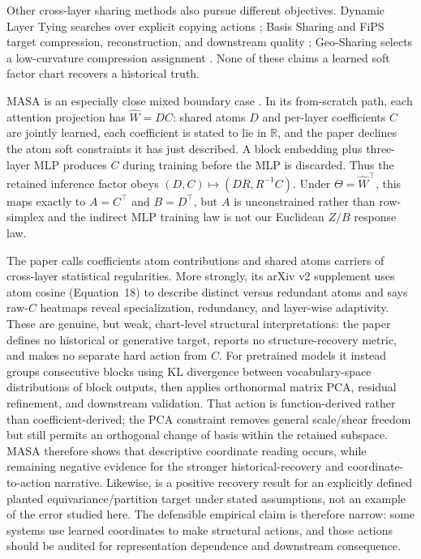 Other cross-layer sharing methods also pursue different objectives.  Dynamic Layer Tying searches over explicit copying
actions \citep{davidhay2024dynamic}; Basis Sharing and FiPS target
compression, reconstruction, and downstream quality
\citep{wang2025basis,uyuk2026fips}; Geo-Sharing selects a low-curvature
compression assignment \citep{zhang2025geosharing}.  None of these claims a
learned soft factor chart recovers a historical truth.

MASA is an especially close mixed boundary case
\citep[AAAI pp.~29262--29263; arXiv v2, supplementary p.~14]{zhussip2026share}.
In its from-scratch path, each attention projection has
$\widehat W=DC$: shared atoms $D$ and per-layer coefficients $C$ are jointly
learned, each coefficient is stated to lie in $\mathbb R$, and the paper
declines the atom soft constraints it has just described.  A block embedding
plus three-layer MLP produces $C$ during training before the MLP is discarded.
Thus the retained inference factor obeys
$(D,C)\mapsto(DR,R^{-1}C)$.  Under
$\Theta=\widehat W^\top$, this maps exactly to $A=C^\top$ and $B=D^\top$, but
$A$ is unconstrained rather than row-simplex and the indirect MLP training law
is not our Euclidean $Z/B$ response law.

The paper calls coefficients atom contributions and shared atoms carriers of
cross-layer statistical regularities.  More strongly, its arXiv v2 supplement
uses atom cosine (Equation~18) to describe distinct versus redundant atoms and
says raw-$C$ heatmaps reveal specialization, redundancy, and layer-wise
adaptivity.  These are genuine, but weak, chart-level structural
interpretations: the paper defines no historical or generative target, reports
no structure-recovery metric, and makes no separate hard action from $C$.
For pretrained models it instead groups consecutive blocks using KL divergence
between vocabulary-space distributions of block outputs, then applies
orthonormal matrix PCA, residual refinement, and downstream validation.  That
action is function-derived rather than coefficient-derived; the PCA constraint
removes general scale/shear freedom but still permits an orthogonal change of
basis within the retained subspace.  MASA therefore shows that descriptive
coordinate reading occurs, while remaining negative evidence for the stronger
historical-recovery and coordinate-to-action narrative.  Likewise,
\citet{yeh2022equivariance} is a positive recovery result for an explicitly
defined planted equivariance/partition target under stated assumptions, not
an example of the error studied here.  The defensible empirical claim is
therefore narrow: some systems use learned coordinates to make structural
actions, and those actions should be audited for representation dependence and
downstream consequence.

